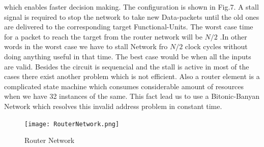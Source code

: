\documentclass[adraft]{eptcs}
\begin{document}
					      which enables faster decision making. The configuration is shown in Fig.7. A stall signal is required
					      to stop the network to take new Data-packets until the old ones are delivered to the corresponding target Functional-Units. The worst case time for a packet to reach the target
					      from the router network will be $N / 2$ .In other words in the worst case we have to stall Network fro $N/2$ clock cycles without doing anything useful in that time. The best
					      case would be when all the inputs are valid. Besides the circuit is sequencial and the stall is active in most of the cases there exist another problem which is not efficient. 
					      Also a router element is a complicated state machine which consumes considerable amount of resources when we have 32 instances of the same. This fact 
					      lead us to use a Bitonic-Banyan Network which resolves this invalid address problem in constant time.
					      \begin{figure}[!ht]
							\texttt{[image: RouterNetwork.png]}
						      \caption{Router Network}
					      \end{figure}
\end{document}
